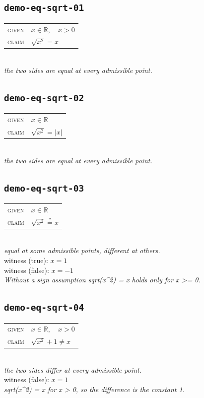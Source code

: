 \documentclass[11pt]{article}
\begin{document}
\subsection*{\texttt{demo-eq-sqrt-01}}
\begin{tabular}{@{}l@{\quad}l@{}}
\textsc{given} & $x \in \mathbb{R},\quad x > 0$ \\[4pt]
\textsc{claim} & $\displaystyle \sqrt{x^{2}} = x$ \\
\end{tabular}\\[2pt]
{\small\emph{the two sides are equal at every admissible point.}}\\

\subsection*{\texttt{demo-eq-sqrt-02}}
\begin{tabular}{@{}l@{\quad}l@{}}
\textsc{given} & $x \in \mathbb{R}$ \\[4pt]
\textsc{claim} & $\displaystyle \sqrt{x^{2}} = \left|x\right|$ \\
\end{tabular}\\[2pt]
{\small\emph{the two sides are equal at every admissible point.}}\\

\subsection*{\texttt{demo-eq-sqrt-03}}
\begin{tabular}{@{}l@{\quad}l@{}}
\textsc{given} & $x \in \mathbb{R}$ \\[4pt]
\textsc{claim} & $\displaystyle \sqrt{x^{2}} \overset{?}{=} x$ \\
\end{tabular}\\[2pt]
{\small\emph{equal at some admissible points, different at others.}}\\
{\footnotesize\color{gray}witness (true): $x = 1$}\\
{\footnotesize\color{gray}witness (false): $x = -1$}\\
\emph{Without a sign assumption sqrt(x\textasciicircum{}2) = x holds only for x >= 0.}\\

\subsection*{\texttt{demo-eq-sqrt-04}}
\begin{tabular}{@{}l@{\quad}l@{}}
\textsc{given} & $x \in \mathbb{R},\quad x > 0$ \\[4pt]
\textsc{claim} & $\displaystyle \sqrt{x^{2}} + 1 \neq x$ \\
\end{tabular}\\[2pt]
{\small\emph{the two sides differ at every admissible point.}}\\
{\footnotesize\color{gray}witness (false): $x = 1$}\\
\emph{sqrt(x\textasciicircum{}2) = x for x > 0, so the difference is the constant 1.}\\
\end{document}
